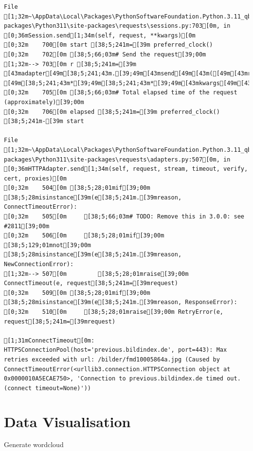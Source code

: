\documentclass[
  letterpaper,
]{book}
\begin{document}
\begin{verbatim}
File [1;32m~\AppData\Local\Packages\PythonSoftwareFoundation.Python.3.11_qbz5n2kfra8p0\LocalCache\local-packages\Python311\site-packages\requests\sessions.py:703[0m, in [0;36mSession.send[1;34m(self, request, **kwargs)[0m
[0;32m    700[0m start [38;5;241m=[39m preferred_clock()
[0;32m    702[0m [38;5;66;03m# Send the request[39;00m
[1;32m--> 703[0m r [38;5;241m=[39m [43madapter[49m[38;5;241;43m.[39;49m[43msend[49m[43m([49m[43mrequest[49m[43m,[49m[43m [49m[38;5;241;43m*[39;49m[38;5;241;43m*[39;49m[43mkwargs[49m[43m)[49m
[0;32m    705[0m [38;5;66;03m# Total elapsed time of the request (approximately)[39;00m
[0;32m    706[0m elapsed [38;5;241m=[39m preferred_clock() [38;5;241m-[39m start

File [1;32m~\AppData\Local\Packages\PythonSoftwareFoundation.Python.3.11_qbz5n2kfra8p0\LocalCache\local-packages\Python311\site-packages\requests\adapters.py:507[0m, in [0;36mHTTPAdapter.send[1;34m(self, request, stream, timeout, verify, cert, proxies)[0m
[0;32m    504[0m [38;5;28;01mif[39;00m [38;5;28misinstance[39m(e[38;5;241m.[39mreason, ConnectTimeoutError):
[0;32m    505[0m     [38;5;66;03m# TODO: Remove this in 3.0.0: see #2811[39;00m
[0;32m    506[0m     [38;5;28;01mif[39;00m [38;5;129;01mnot[39;00m [38;5;28misinstance[39m(e[38;5;241m.[39mreason, NewConnectionError):
[1;32m--> 507[0m         [38;5;28;01mraise[39;00m ConnectTimeout(e, request[38;5;241m=[39mrequest)
[0;32m    509[0m [38;5;28;01mif[39;00m [38;5;28misinstance[39m(e[38;5;241m.[39mreason, ResponseError):
[0;32m    510[0m     [38;5;28;01mraise[39;00m RetryError(e, request[38;5;241m=[39mrequest)

[1;31mConnectTimeout[0m: HTTPSConnectionPool(host='previous.bildindex.de', port=443): Max retries exceeded with url: /bilder/fmd10005864a.jpg (Caused by ConnectTimeoutError(<urllib3.connection.HTTPSConnection object at 0x0000010A5ECAE750>, 'Connection to previous.bildindex.de timed out. (connect timeout=None)'))
\end{verbatim}


\chapter{Data Visualisation}\label{data-visualisation}

Generate wordcloud
\end{document}

